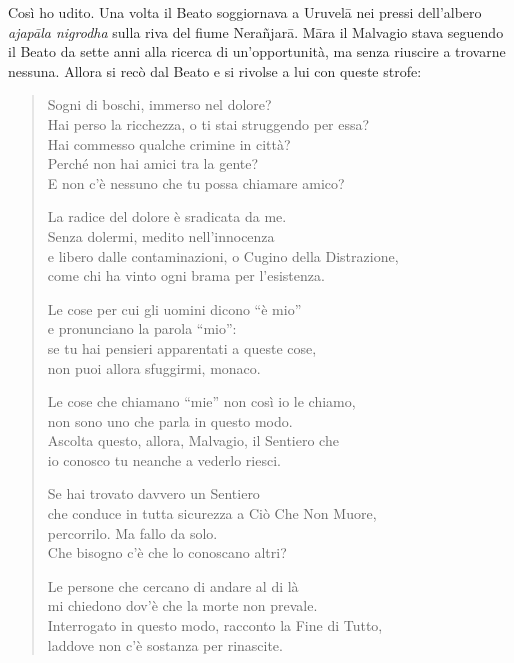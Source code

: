  Così ho udito. Una volta il Beato soggiornava a Uruvelā nei
pressi dell’albero \emph{ajapāla nigrodha} sulla riva del fiume Nerañjarā.
Māra il Malvagio stava seguendo il Beato da sette anni alla ricerca di
un’opportunità, ma senza riuscire a trovarne nessuna. Allora si recò dal
Beato e si rivolse a lui con queste strofe:


\begin{quote}
Sogni di boschi, immerso nel dolore? \\
Hai perso la ricchezza, o ti stai struggendo per essa? \\
Hai commesso qualche crimine in città? \\
Perché non hai amici tra la gente? \\
E non c’è nessuno che tu possa chiamare amico?


La radice del dolore è sradicata da me. \\
Senza dolermi, medito nell’innocenza \\
e libero dalle contaminazioni, o Cugino della Distrazione, \\
come chi ha vinto ogni brama per l’esistenza.


Le cose per cui gli uomini dicono “è mio” \\
e pronunciano la parola “mio”: \\
se tu hai pensieri apparentati a queste cose, \\
non puoi allora sfuggirmi, monaco.


Le cose che chiamano “mie” non così io le chiamo, \\
non sono uno che parla in questo modo. \\
Ascolta questo, allora, Malvagio, il Sentiero che \\
io conosco tu neanche a vederlo riesci.


Se hai trovato davvero un Sentiero \\
che conduce in tutta sicurezza a Ciò Che Non Muore, \\
percorrilo. Ma fallo da solo. \\
Che bisogno c’è che lo conoscano altri?


Le persone che cercano di andare al di là \\
mi chiedono dov’è che la morte non prevale. \\
Interrogato in questo modo, racconto la Fine di Tutto, \\
laddove non c’è sostanza per rinascite.
\end{quote}

